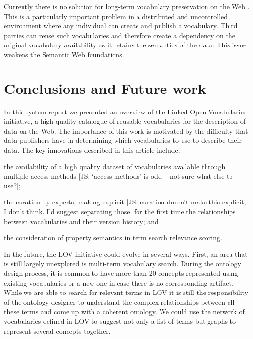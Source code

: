 \documentclass{iosart2c}
\begin{document}
Currently there is no solution for long-term vocabulary preservation on the Web \cite{Baker2013HLT}. This is a particularly important problem in a distributed and uncontrolled environment where any individual can create and publish a vocabulary. Third parties can reuse such vocabularies and therefore create a dependency on the original vocabulary availability as it retains the semantics of the data. This issue weakens the Semantic Web foundations. 




\section{Conclusions and Future work}
\label{sec:conclusion}

In this system report we presented an overview of the Linked Open Vocabularies initiative, a high quality catalogue of reusable vocabularies for the description of data on the Web. The importance of this work is motivated by the difficulty that data publishers have in determining which vocabularies to use to describe their data. The key innovations described in this article include: 
\begin{inparaenum}[1)] 
	\item the availability of a high quality dataset of vocabularies available through multiple access methods [JS: `access methods' is odd -- not sure what else to use?];
	\item the curation by experts, making explicit [JS: curation doesn't make this explicit, I don't think. I'd suggest separating those] for the first time the relationships between vocabularies and their version history; and
	\item the consideration of property semantics in term search relevance scoring.
\end{inparaenum}

In the future, the LOV initiative could evolve in several ways. First, an area that is still largely unexplored is multi-term vocabulary search. During the ontology design process, it is common to have more than 20 concepts represented using existing vocabularies or a new one in case there is no corresponding artifact. While we are able to search for relevant terms in LOV it is still the responsibility of the ontology designer to understand the complex relationships between all these terms and come up with a coherent ontology. We could use the network of vocabularies defined in LOV to suggest not only a list of terms but graphs to represent several concepts together. 
\end{document}
